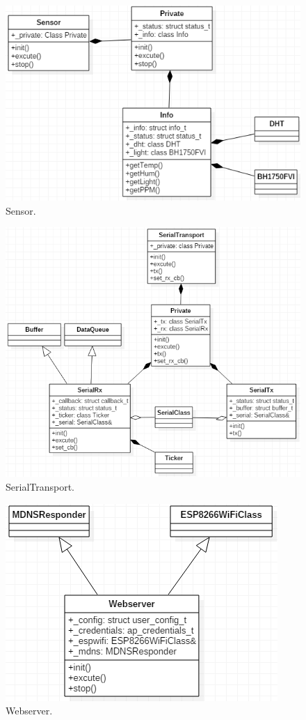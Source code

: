 \documentclass[a4paper,12pt,oneside]{article}
\begin{document}
\begin{itemize}
\begin{itemize}
\begin{figure}[H]
\centering
\includegraphics[scale=.85]{hinh/class_sensor.PNG}
\caption{Sensor.}
\end{figure}

\begin{figure}[H]
\centering
\includegraphics[scale=.65]{hinh/class_serialtransport.PNG}
\caption{SerialTransport.}
\end{figure}

\begin{figure}[H]
\centering
\includegraphics[scale=.85]{hinh/class_webserver.PNG}
\caption{ Webserver.}
\end{figure}


\end{itemize}
\end{itemize}
\end{document}
